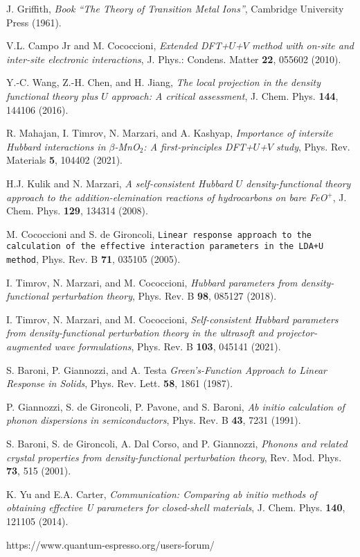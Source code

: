 \documentclass[12pt,a4paper]{article}
\begin{document}
\begin{thebibliography}{100}
   J. Griffith, \textit{Book ``The Theory of Transition Metal Ions''}, Cambridge University Press (1961).
  
   V.L. Campo Jr and M. Cococcioni, \textit{Extended DFT+$U$+$V$ method with on-site and inter-site electronic interactions}, J. Phys.: Condens. Matter {\bf 22}, 055602 (2010).
  
   Y.-C. Wang, Z.-H. Chen, and H. Jiang, \textit{The local projection in the density functional theory plus $U$ approach: A critical assessment}, J. Chem. Phys. {\bf 144}, 144106 (2016).
  
   R. Mahajan, I. Timrov, N. Marzari, and A. Kashyap, \textit{Importance of intersite Hubbard interactions in $\beta$-MnO$_2$: A first-principles DFT+$U$+$V$ study}, Phys. Rev. Materials {\bf 5}, 104402 (2021).
  
   H.J. Kulik and N. Marzari, \textit{A self-consistent Hubbard $U$ density-functional theory approach to the addition-elemination reactions of hydrocarbons on bare FeO$^+$}, J. Chem. Phys. {\bf 129}, 134314 (2008).
  
   M. Cococcioni and S. de Gironcoli, \texttt{Linear response approach to the calculation of the effective interaction parameters in the LDA+U method}, Phys. Rev. B {\bf 71}, 035105 (2005).
  
   I. Timrov, N. Marzari, and M. Cococcioni, \textit{Hubbard parameters from density-functional perturbation theory}, Phys. Rev. B {\bf 98}, 085127 (2018).
  
   I. Timrov, N. Marzari, and M. Cococcioni, \textit{Self-consistent Hubbard parameters from density-functional perturbation theory in the ultrasoft and projector-augmented wave formulations}, Phys. Rev. B {\bf 103}, 045141 (2021).
  
   S. Baroni, P. Giannozzi, and A. Testa \textit{Green's-Function Approach to Linear Response in Solids}, Phys. Rev. Lett. {\bf 58}, 1861 (1987).
  
   P. Giannozzi, S. de Gironcoli, P. Pavone, and S. Baroni, \textit{Ab initio calculation of phonon dispersions in semiconductors}, Phys. Rev. B {\bf 43}, 7231 (1991).
  
   S. Baroni, S. de Gironcoli, A. Dal Corso, and P. Giannozzi, \textit{Phonons and related crystal properties from density-functional perturbation theory}, Rev. Mod. Phys. {\bf 73}, 515 (2001).
  
   K. Yu and E.A. Carter, \textit{Communication: Comparing ab initio methods of obtaining effective U parameters for closed-shell materials}, J. Chem. Phys. {\bf 140}, 121105 (2014).
  
   https://www.quantum-espresso.org/users-forum/
  
\end{thebibliography}
\end{document}
